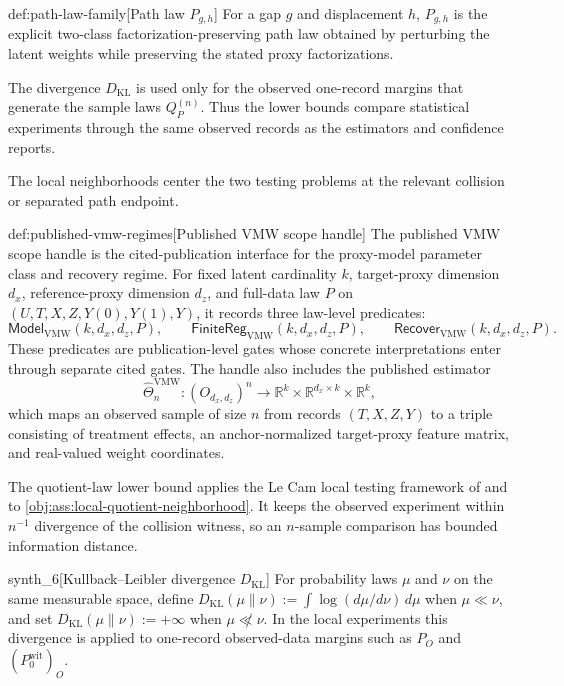 \documentclass[11pt]{article}
\begin{document}
\begin{definitionv}{def:path-law-family}[Path law \(P_{g,h}\)]
For a gap \(g\) and displacement \(h\), \(P_{g,h}\) is the explicit two-class factorization-preserving path law obtained by perturbing the latent weights while preserving the stated proxy factorizations.
\end{definitionv}

The divergence \(D_{\mathrm{KL}}\) is used only for the observed one-record margins that generate the sample laws \(Q_P^{(n)}\). Thus the lower bounds compare statistical experiments through the same observed records as the estimators and confidence reports.

The local neighborhoods center the two testing problems at the relevant collision or separated path endpoint.

\begin{definitionv}{def:published-vmw-regimes}[Published VMW scope handle]
The published VMW scope handle is the cited-publication interface for the proxy-model parameter class and recovery regime. For fixed latent cardinality \(k\), target-proxy dimension \(d_x\), reference-proxy dimension \(d_z\), and full-data law \(P\) on \((U,T,X,Z,Y(0),Y(1),Y)\), it records three law-level predicates:
\[
\mathsf{Model}_{\mathrm{VMW}}(k,d_x,d_z,P),
\qquad
\mathsf{FiniteReg}_{\mathrm{VMW}}(k,d_x,d_z,P),
\qquad
\mathsf{Recover}_{\mathrm{VMW}}(k,d_x,d_z,P).
\]
These predicates are publication-level gates whose concrete interpretations enter through separate cited gates. The handle also includes the published estimator
\[
\widehat\Theta^{\mathrm{VMW}}_n:
(O_{d_x,d_z})^n
\to
\mathbb R^k\times\mathbb R^{d_x\times k}\times\mathbb R^k,
\]
which maps an observed sample of size \(n\) from records \((T,X,Z,Y)\) to a triple consisting of treatment effects, an anchor-normalized target-proxy feature matrix, and real-valued weight coordinates.
\end{definitionv}

The quotient-law lower bound applies the Le Cam local testing framework of \citet{LeCam1986} and \citet{PolyanskiyWu2019} to \cref{obj:ass:local-quotient-neighborhood}. It keeps the observed experiment within \(n^{-1}\) divergence of the collision witness, so an \(n\)-sample comparison has bounded information distance.

\begin{definitionv}{synth_6}[Kullback--Leibler divergence $D_{\mathrm{KL}}$]
For probability laws $\mu$ and $\nu$ on the same measurable space, define $D_{\mathrm{KL}}(\mu\|\nu):=\int \log(d\mu/d\nu)\,d\mu$ when $\mu\ll\nu$, and set $D_{\mathrm{KL}}(\mu\|\nu):=+\infty$ when $\mu\not\ll\nu$. In the local experiments this divergence is applied to one-record observed-data margins such as $P_O$ and $(P_0^{\mathrm{wit}})_O$.
\end{definitionv}
\end{document}
